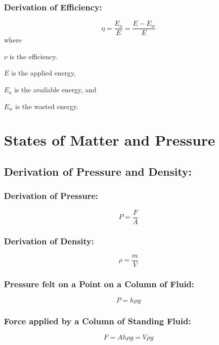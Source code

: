 \documentclass[a4paper]{report}
\begin{document}
        \subsection{Derivation of Efficiency: }
            \begin{equation}
                \eta = \frac{E_a}{E} = \frac{E - E_w}{E}
            \end{equation}
            where
            \begin{description}
                \item $\nu$ is the efficiency.
                \item $E$ is the applied energy,
                \item $E_a$ is the available energy, and
                \item $E_w$ is the wasted energy.
            \end{description}

            
\chapter{States of Matter and Pressure}
    \section{Derivation of Pressure and Density: }
        \subsection{Derivation of Pressure: }
            \begin{equation}
                P = \frac{F}{A}
            \end{equation}
        \subsection{Derivation of Density: }
            \begin{equation}
                \rho = \frac{m}{V}
            \end{equation}
        \subsection{Pressure felt on a Point on a Column of Fluid: }
            \begin{equation}
                P = h \rho g
            \end{equation}
        \subsection{Force applied by a Column of Standing Fluid: }
            \begin{equation}
                F = Ah \rho g = V \rho g
            \end{equation}
\end{document}
